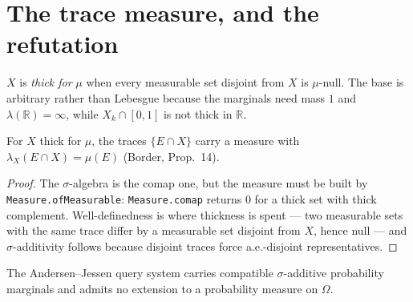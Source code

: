 \section{The trace measure, and the refutation}

\begin{definition}
\label{def:thick-for}
\leanok
  $X$ is \emph{thick for} $\mu$ when every measurable set disjoint from $X$ is
$\mu$-null. The base is arbitrary rather than Lebesgue because the marginals
need mass $1$ and $\lambda(\mathbb{R}) = \infty$, while $X_k \cap [0,1]$ is not
thick in $\mathbb{R}$.
\end{definition}

\begin{theorem}
\label{thm:trace-measure}
\leanok
For $X$ thick for $\mu$, the traces $\{E \cap X\}$ carry a measure with
$\lambda_X(E \cap X) = \mu(E)$ (Border, Prop.~14).
\end{theorem}

\begin{proof}
\leanok
{}
The $\sigma$-algebra is the comap one, but the measure must be built by
\texttt{Measure.ofMeasurable}: \texttt{Measure.comap} returns $0$ for a thick
set with thick complement. Well-definedness is where thickness is spent --- two
measurable sets with the same trace differ by a measurable set disjoint from
$X$, hence null --- and $\sigma$-additivity follows because disjoint traces
force a.e.-disjoint representatives.
\end{proof}

\begin{theorem}
\label{thm:aj-no-extension}
\leanok
The Andersen--Jessen query system carries compatible $\sigma$-additive
probability marginals and admits no extension to a probability measure on
$\Omega$.
\end{theorem}


